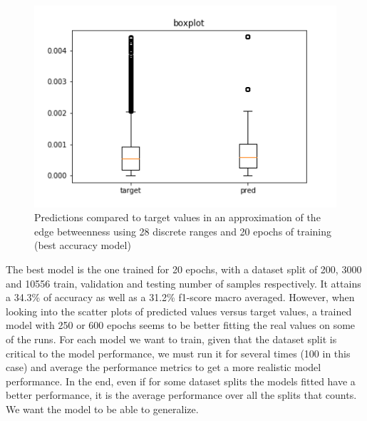 \begin{figure}[H]
\endminipage
{}%
  \centering
    \includegraphics[width=0.9\linewidth]{img/GN_exp1/28bins/boxplot_20epochs.png}
\endminipage
\caption{Predictions compared to target values in an approximation of the edge betweenness using 28 discrete ranges and 20 epochs of training (best accuracy model) }\label{fig:edgeb_exp1_10bins}
\end{figure}


The best model is the one trained for 20 epochs, with a dataset split of 200, 3000 and 10556 train, validation and testing number of samples respectively. It attains a 34.3\% of accuracy as well as a 31.2\% f1-score macro averaged. However, when looking  into the scatter plots of predicted values versus target values, a trained model with 250 or 600 epochs seems to be better fitting the real values on some of the runs. For each model we want to train, given that the dataset split is critical to the model performance, we must run it for several times (100 in this case) and average the performance metrics to get a more realistic model performance. In the end, even if for some dataset splits the models fitted have a better performance, it is the average performance over all the splits that counts. We want the model to be able to generalize.



